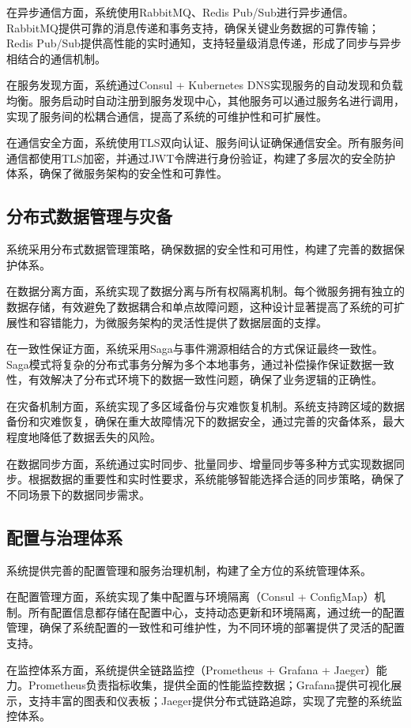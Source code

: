 在异步通信方面，系统使用RabbitMQ、Redis Pub/Sub进行异步通信。RabbitMQ提供可靠的消息传递和事务支持，确保关键业务数据的可靠传输；Redis Pub/Sub提供高性能的实时通知，支持轻量级消息传递，形成了同步与异步相结合的通信机制。

在服务发现方面，系统通过Consul + Kubernetes DNS实现服务的自动发现和负载均衡。服务启动时自动注册到服务发现中心，其他服务可以通过服务名进行调用，实现了服务间的松耦合通信，提高了系统的可维护性和可扩展性。

在通信安全方面，系统使用TLS双向认证、服务间认证确保通信安全。所有服务间通信都使用TLS加密，并通过JWT令牌进行身份验证，构建了多层次的安全防护体系，确保了微服务架构的安全性和可靠性。

\subsection{分布式数据管理与灾备}

系统采用分布式数据管理策略，确保数据的安全性和可用性，构建了完善的数据保护体系。

在数据分离方面，系统实现了数据分离与所有权隔离机制。每个微服务拥有独立的数据存储，有效避免了数据耦合和单点故障问题，这种设计显著提高了系统的可扩展性和容错能力，为微服务架构的灵活性提供了数据层面的支撑。

在一致性保证方面，系统采用Saga与事件溯源相结合的方式保证最终一致性。Saga模式将复杂的分布式事务分解为多个本地事务，通过补偿操作保证数据一致性，有效解决了分布式环境下的数据一致性问题，确保了业务逻辑的正确性。

在灾备机制方面，系统实现了多区域备份与灾难恢复机制。系统支持跨区域的数据备份和灾难恢复，确保在重大故障情况下的数据安全，通过完善的灾备体系，最大程度地降低了数据丢失的风险。

在数据同步方面，系统通过实时同步、批量同步、增量同步等多种方式实现数据同步。根据数据的重要性和实时性要求，系统能够智能选择合适的同步策略，确保了不同场景下的数据同步需求。

\subsection{配置与治理体系}

系统提供完善的配置管理和服务治理机制，构建了全方位的系统管理体系。

在配置管理方面，系统实现了集中配置与环境隔离（Consul + ConfigMap）机制。所有配置信息都存储在配置中心，支持动态更新和环境隔离，通过统一的配置管理，确保了系统配置的一致性和可维护性，为不同环境的部署提供了灵活的配置支持。

在监控体系方面，系统提供全链路监控（Prometheus + Grafana + Jaeger）能力。Prometheus负责指标收集，提供全面的性能监控数据；Grafana提供可视化展示，支持丰富的图表和仪表板；Jaeger提供分布式链路追踪，实现了完整的系统监控体系。

